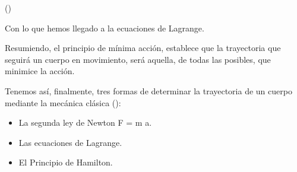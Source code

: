 (\cite{Taylor})

Con lo que hemos llegado a la ecuaciones de Lagrange.

Resumiendo, el principio de mínima acción, establece que la trayectoria que seguirá un cuerpo en movimiento, será aquella, de todas las posibles, que minimice la acción.

Tenemos así, finalmente, tres formas de determinar la trayectoria de un cuerpo mediante la mecánica clásica (\cite[264]{Taylor}):
\begin{itemize}
    \item La segunda ley de Newton F = m \cdot a.
    \item Las ecuaciones de Lagrange.
    \item El Principio de Hamilton.
\end{itemize}